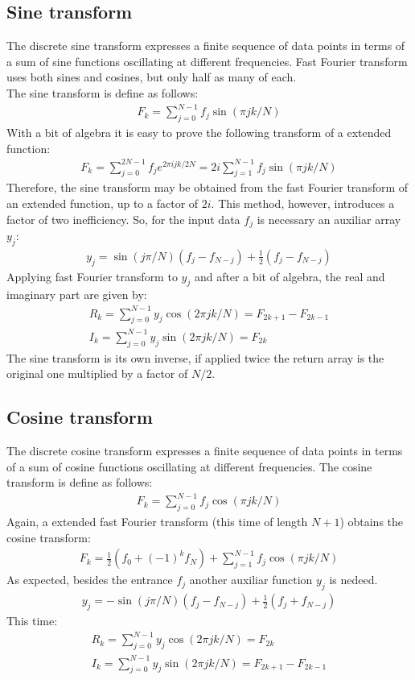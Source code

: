 \documentclass[letterpaper]{article}
\begin{document}
\subsection{Sine transform} 
The discrete sine transform expresses a finite sequence of data points in terms of a sum of sine functions oscillating at different frequencies. Fast Fourier transform uses both sines and cosines, but only half as many of each.\\
The sine transform is define as follows:
\begin{align}
F_k= \sum_{j=0}^{N-1}f_j \sin(\pi j k /N)	
\end{align}
With a bit of algebra it is easy to prove the following transform of a extended function:
\begin{align}
F_k=\sum_{j=0}^{2N-1}f_je^{2\pi i j k / 2N}= 2i\sum_{j=1}^{N-1}f_j \sin(\pi j k /N)	
\end{align}
Therefore, the sine transform may be obtained from the fast Fourier transform of  an extended function, up to a factor of $2i$. This method, however, introduces a factor of two inefficiency.	So, for the input data $f_j$ is necessary an auxiliar array $y_j$:
\begin{align}
y_j=\sin(j\pi /N)(f_j-f_{N-j})+\frac{1}{2}(f_j-f_{N-j})
\end{align}
Applying fast Fourier transform to $y_j$ and after a bit of algebra, the real and imaginary part are given by:
\begin{align}
R_k=\sum_{j=0}^{N-1}y_j\cos(2\pi jk/N)=F_{2k+1}-F_{2k-1}\\
I_k=\sum_{j=0}^{N-1}y_j\sin(2\pi jk/N)=F_{2k}
\end{align}
The sine transform is its own inverse, if applied twice the return array is the original one multiplied by a factor  of $N/2$.

\subsection{Cosine transform}
The discrete cosine transform expresses a finite sequence of data points in terms of a sum of cosine functions oscillating at different frequencies.
The cosine transform is define as follows:
\begin{align}
F_k= \sum_{j=0}^{N-1}f_j \cos(\pi j k /N)	
\end{align}
Again, a extended fast Fourier transform (this time of length $N+1$) obtains the cosine transform:
\begin{align}
F_k= \frac{1}{2}(f_0+(-1)^kf_N)+\sum_{j=1}^{N-1}f_j \cos(\pi j k /N)	
\end{align}
As expected, besides the entrance $f_j$ another auxiliar function $y_j$ is nedeed.
\begin{align}
y_j=-\sin(j\pi /N)(f_j-f_{N-j})+\frac{1}{2}(f_j+f_{N-j})
\end{align}
This time:
\begin{align}
R_k=\sum_{j=0}^{N-1}y_j\cos(2\pi jk/N)=F_{2k}\\
I_k=\sum_{j=0}^{N-1}y_j\sin(2\pi jk/N)=F_{2k+1}-F_{2k-1}
\end{align}
\end{document}
